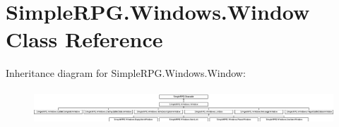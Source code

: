 \hypertarget{class_simple_r_p_g_1_1_windows_1_1_window}{\section{Simple\-R\-P\-G.\-Windows.\-Window Class Reference}
\label{class_simple_r_p_g_1_1_windows_1_1_window}
}
Inheritance diagram for Simple\-R\-P\-G.\-Windows.\-Window\-:\begin{figure}[H]
\begin{center}
\leavevmode
\includegraphics[height=1.300813cm]{class_simple_r_p_g_1_1_windows_1_1_window}
\end{center}
\end{figure}
